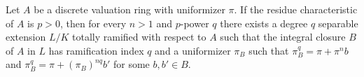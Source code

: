 \begin{lemma}
\label{lemma-make-degree-q-extension}
Let $A$ be a discrete valuation ring with uniformizer $\pi$. If the residue
characteristic of $A$ is $p > 0$, then for every $n > 1$ and $p$-power $q$
there exists a degree $q$ separable extension $L/K$
totally ramified with respect to $A$
such that the integral closure $B$ of $A$ in $L$ has ramification index
$q$ and a uniformizer $\pi_B$ such that
$\pi_B^q = \pi + \pi^n b$ and $\pi_B^q = \pi + (\pi_B)^{nq}b'$
for some $b, b' \in B$.
\end{lemma}